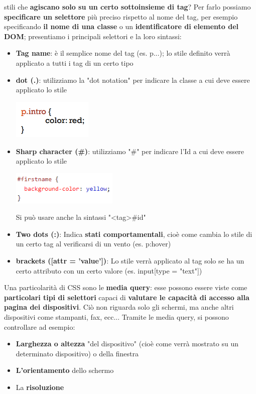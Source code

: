 \documentclass[12pt]{article}
\begin{document}
stili che \textbf{agiscano solo su un certo sottoinsieme di tag}? Per farlo possiamo \textbf{specificare un selettore} più preciso rispetto al nome del tag, per esempio specificando \textbf{il nome di una classe} o un \textbf{identificatore di elemento del DOM};
presentiamo i principali selettori e la loro sintassi:
\begin{itemize}
    \item \textbf{Tag name}: è il semplice nome del tag (es. p{...}); lo stile definito verrà applicato a tutti i tag di un certo tipo
    \item \textbf{dot (.)}: utilizziamo la "dot notation" per indicare la classe a cui deve essere applicato lo stile
    \begin{center}
        \includegraphics[width = 0.30\textwidth]{Images/159.PNG}
    \end{center}
    \item \textbf{Sharp character (\#)}: utilizziamo "\#" per indicare l'Id a cui deve essere applicato lo stile
    \begin{center}
        \includegraphics[width = 0.40\textwidth]{Images/160.PNG}
    \end{center}
    Si può usare anche la sintassi "<tag>\#id"
    \item \textbf{Two dots (:)}: Indica \textbf{stati comportamentali}, cioè come cambia lo stile di un certo tag al verificarsi di un vento (es. p:hover)
    \item \textbf{brackets ([attr = 'value'])}: Lo stile verrà applicato al tag solo se ha un certo attributo con un certo valore (es. input[type = "text"])
\end{itemize}
Una particolarità di CSS sono le \textbf{media query}: esse possono essere viste come \textbf{particolari tipi di selettori} capaci di \textbf{valutare le capacità di accesso alla pagina dei dispositivi}.
Ciò non riguarda solo gli schermi, ma anche altri dispositivi come stampanti, fax, ecc...  \newline
Tramite le media query, si possono controllare ad esempio:
\begin{itemize}
    \item \textbf{Larghezza o altezza} "del dispositivo" (cioè come verrà mostrato su un determinato dispositivo) o della finestra
    \item \textbf{L'orientamento} dello schermo
    \item La \textbf{risoluzione}
\end{itemize}
\end{document}
